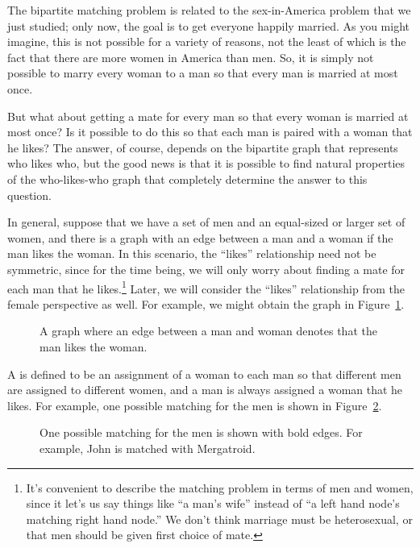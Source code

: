 The bipartite matching problem is related to the sex-in-America
problem that we just studied; only now, the goal is to get everyone
happily married.  As you might imagine, this is not possible for a
variety of reasons, not the least of which is the fact that there are
more women in America than men.  So, it is simply not possible to
marry every woman to a man so that every man is married at most once.

But what about getting a mate for every man so that every woman is married
at most once?  Is it possible to do this so that each man is paired with a
woman that he likes?  The answer, of course, depends on the bipartite graph
that represents who likes who, but the good news is that it is possible to
find natural properties of the who-likes-who graph that completely
determine the answer to this question.

In general, suppose that we have a set of men and an equal-sized or
larger set of women, and there is a graph with an edge between a man
and a woman if the man likes the woman.  In this scenario, the
``likes'' relationship need not be symmetric, since for the time
being, we will only worry about finding a mate for each man that he
likes.\footnote{It's convenient to describe the matching problem in
  terms of men and women, since it let's us say things like ``a man's
  wife'' instead of ``a left hand node's matching right hand node.''
  We don't think marriage must be heterosexual, or that men should be
  given first choice of mate.}  Later, we will consider the ``likes''
relationship from the female perspective as well.  For example, we
might obtain the graph in Figure~\ref{fig:5J}.

\begin{figure}
\caption{A graph where an edge between a man and woman denotes that
  the man likes the woman.}
\label{fig:5J}
\end{figure}

A  is defined to be an assignment of a woman to each
man so that different men are assigned to different women, and a man
is always assigned a woman that he likes.  For example, one possible
matching for the men is shown in Figure~\ref{fig:5K}.

\begin{figure}
\caption{One possible matching for the men is shown with bold edges.
  For example, John is matched with Mergatroid.}
\label{fig:5K}
\end{figure}

